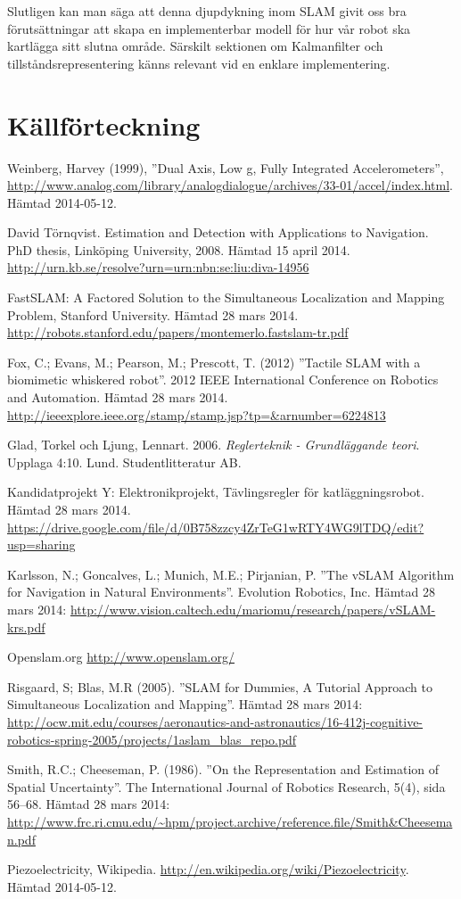 \documentclass[a4paper,12pt,fleqn]{article}
\begin{document}
Slutligen kan man säga att denna djupdykning inom SLAM givit oss bra förutsättningar att skapa en implementerbar modell för hur vår robot ska kartlägga sitt slutna område. Särskilt sektionen om Kalmanfilter och tillståndsrepresentering känns relevant vid en enklare implementering. 

\newpage 
\section*{Källförteckning} 

Weinberg, Harvey (1999), ''Dual Axis, Low g, Fully Integrated Accelerometers'', \url{http://www.analog.com/library/analogdialogue/archives/33-01/accel/index.html}. Hämtad 2014-05-12.

David Törnqvist. Estimation and Detection with Applications to Navigation. PhD thesis, Linköping University, 2008. Hämtad 15 april 2014.
\url{http://urn.kb.se/resolve?urn=urn:nbn:se:liu:diva-14956}

FastSLAM: A Factored Solution to the Simultaneous
Localization and Mapping Problem, Stanford University. Hämtad 28 mars 2014.
\url{http://robots.stanford.edu/papers/montemerlo.fastslam-tr.pdf}

Fox, C.; Evans, M.; Pearson, M.; Prescott, T. (2012)
''Tactile SLAM with a biomimetic whiskered robot''. 2012 IEEE International Conference on Robotics and Automation. Hämtad 28 mars 2014.
\url{http://ieeexplore.ieee.org/stamp/stamp.jsp?tp=&arnumber=6224813}

Glad, Torkel och Ljung, Lennart. 2006. \textit{Reglerteknik - Grundläggande teori}. Upplaga 4:10. Lund. Studentlitteratur AB.

Kandidatprojekt Y: Elektronikprojekt, Tävlingsregler för katläggningsrobot. Hämtad 28 mars 2014.  \url{https://drive.google.com/file/d/0B758zzcy4ZrTeG1wRTY4WG9lTDQ/edit?usp=sharing}

Karlsson, N.; Goncalves, L.; Munich, M.E.; Pirjanian, P.
''The vSLAM Algorithm for Navigation in Natural Environments''. Evolution Robotics, Inc. Hämtad 28 mars 2014:
\url{http://www.vision.caltech.edu/mariomu/research/papers/vSLAM-krs.pdf}

Openslam.org
\url{http://www.openslam.org/}

Risgaard, S; Blas, M.R (2005).
''SLAM for Dummies, A Tutorial Approach to Simultaneous Localization and Mapping''. 
Hämtad 28 mars 2014:
\url{http://ocw.mit.edu/courses/aeronautics-and-astronautics/16-412j-cognitive-robotics-spring-2005/projects/1aslam_blas_repo.pdf}

Smith, R.C.; Cheeseman, P. (1986). ''On the Representation and Estimation of Spatial Uncertainty''. The
International Journal of Robotics Research, 5(4), sida 56–68. Hämtad
28 mars 2014:
\url{http://www.frc.ri.cmu.edu/~hpm/project.archive/reference.file/Smith&Cheeseman.pdf}

Piezoelectricity, Wikipedia. \url{http://en.wikipedia.org/wiki/Piezoelectricity}. Hämtad 2014-05-12.
\end{document}
